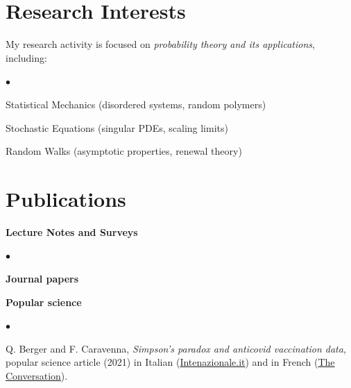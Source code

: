 \documentclass[a4paper,11pt,oneside]{amsart}
\newenvironment{myitemize}{%
\begin{list}{$\bullet$}%
 	{%
	\setlength{\itemsep}{0.3em}%
	\setlength{\topsep}{0.3em}%
	\setlength{\partopsep}{0em}%
	\setlength{\parsep}{0em}%
	\setlength{\parskip}{0em}%
	\setlength\leftmargin{1.5em}%
	\setlength\labelwidth{1.1em}%
	\setlength{\labelsep}{0.4em}%
	}%
	}%
{\end{list}}
\renewenvironment{itemize}{
\begin{myitemize}}%
{\end{myitemize}}
\begin{document}
\section{Research Interests}

My research activity is focused on \emph{probability theory and its applications}, including:
\begin{itemize}
\item Statistical Mechanics (disordered systems, random polymers)
\item Stochastic Equations (singular PDEs, scaling limits)
\item Random Walks (asymptotic properties, renewal theory)
\end{itemize}

%


\section{Publications}

\medskip
{\large\sf \bfseries Lecture Notes and Surveys}
\smallskip

\begin{itemize}

\end{itemize}


\medskip
{\large\sf \bfseries Journal papers}
\smallskip

\begin{etaremune}

\end{etaremune}

\smallskip
\medskip
{\large\sf \bfseries Popular science}
\smallskip

\begin{itemize}
\item Q. Berger and F. Caravenna,
\textit{Simpson's paradox and anticovid vaccination data},
popular science article (2021) in Italian 
(\href{https://www.internazionale.it/notizie/quentin-berger/2021/12/09/vaccini-dati-paradosso-simpson}{Intenazionale.it}) 
and in French
(\href{https://theconversation.com/le-paradoxe-de-simpson-illustre-par-des-donnees-de-vaccination-contre-le-covid-19-170159}{The Conversation}).
\end{itemize}
\end{document}
